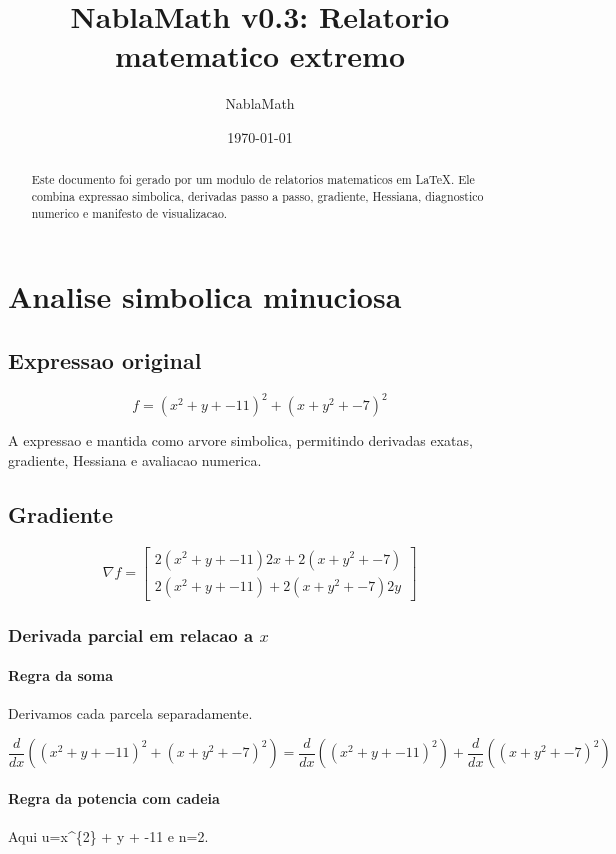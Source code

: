 \documentclass[11pt,a4paper]{article}
\title{NablaMath v0.3: Relatorio matematico extremo}
\author{NablaMath}
\date{\today}
\begin{document}
\maketitle
\begin{abstract}
Este documento foi gerado por um modulo de relatorios matematicos em LaTeX. Ele combina expressao simbolica, derivadas passo a passo, gradiente, Hessiana, diagnostico numerico e manifesto de visualizacao.
\end{abstract}
\tableofcontents
\newpage
\section{Analise simbolica minuciosa}
\subsection{Expressao original}

\[
f=\left(x^{2} + y + -11\right)^{2} + \left(x + y^{2} + -7\right)^{2}
\]

A expressao e mantida como arvore simbolica, permitindo derivadas exatas, gradiente, Hessiana e avaliacao numerica.

\subsection{Gradiente}

\[
\nabla f=\begin{bmatrix}2\left(x^{2} + y + -11\right)2x + 2\left(x + y^{2} + -7\right)\\2\left(x^{2} + y + -11\right) + 2\left(x + y^{2} + -7\right)2y\end{bmatrix}
\]

\subsubsection{Derivada parcial em relacao a $x$}

\paragraph{Regra da soma} Derivamos cada parcela separadamente.

\[
\frac{d}{dx}\left(\left(x^{2} + y + -11\right)^{2} + \left(x + y^{2} + -7\right)^{2}\right)=\frac{d}{dx}\left(\left(x^{2} + y + -11\right)^{2}\right)+\frac{d}{dx}\left(\left(x + y^{2} + -7\right)^{2}\right)
\]

\paragraph{Regra da potencia com cadeia} Aqui u=x\textasciicircum{}\{2\} + y + -11 e n=2.
\end{document}
